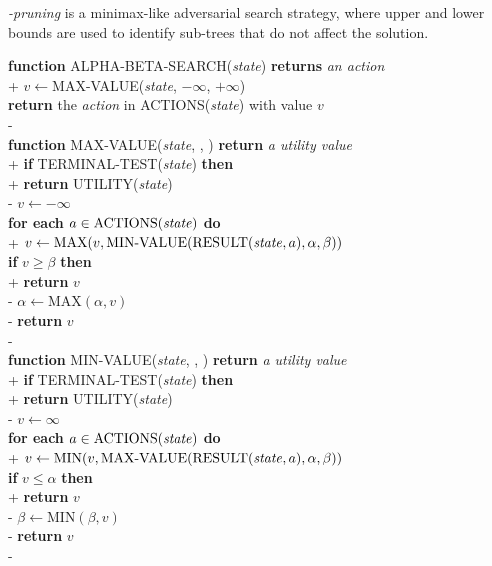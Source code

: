 \documentclass{article}
\begin{document}
\begin{definition}
    \emph{\alpha-\beta pruning} is a minimax-like adversarial search
    strategy, where upper and lower bounds are used to identify
    sub-trees that do not affect the solution.
    \begin{pseudo}
        \textbf{function} ALPHA-BETA-SEARCH(\emph{state}) \textbf{returns} \emph{an action}\\+
            $v\leftarrow$MAX-VALUE(\emph{state}, $-\infty$, $+\infty$)\\
            \textbf{return} the \emph{action} in ACTIONS(\emph{state}) with value $v$\\-
        \\
        \textbf{function} MAX-VALUE(\emph{state}, \alpha, \beta) \textbf{return} \emph{a utility value}\\+
            \textbf{if} TERMINAL-TEST(\emph{state}) \textbf{then}\\+
                \textbf{return} UTILITY(\emph{state})\\-
            $v\leftarrow-\infty$\\
            \textbf{for each} $a\in\text{ACTIONS(\emph{state})}$ \textbf{do}\\+
                $v\leftarrow \text{MAX}(v, \text{MIN-VALUE}(\text{RESULT}(\text{\emph{state}}, a), \alpha, \beta))$\\
                \textbf{if} $v\geq \beta$ \textbf{then}\\+
                    \textbf{return} $v$\\-
                $\alpha\leftarrow\text{MAX}(\alpha, v)$\\-
            \textbf{return} $v$\\-
        \\
        \textbf{function} MIN-VALUE(\emph{state}, \alpha, \beta) \textbf{return} \emph{a utility value}\\+
            \textbf{if} TERMINAL-TEST(\emph{state}) \textbf{then}\\+
                \textbf{return} UTILITY(\emph{state})\\-
            $v\leftarrow\infty$\\
            \textbf{for each} $a\in\text{ACTIONS(\emph{state})}$ \textbf{do}\\+
                $v\leftarrow \text{MIN}(v, \text{MAX-VALUE}(\text{RESULT}(\text{\emph{state}}, a), \alpha, \beta))$\\
                \textbf{if} $v\leq \alpha$ \textbf{then}\\+
                    \textbf{return} $v$\\-
                $\beta\leftarrow\text{MIN}(\beta, v)$\\-
            \textbf{return} $v$\\-
    \end{pseudo}
\end{definition}
\end{document}
